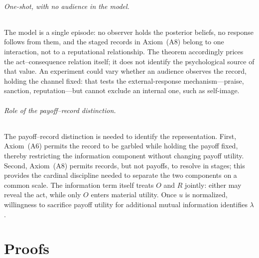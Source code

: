 \documentclass[11pt,a4paper]{article}
\theoremstyle{definition}
\newcommand{\1}{\mathbf 1}
\begin{document}
\paragraph{One-shot, with no audience in the model.}
The model is a single episode: no observer holds the posterior beliefs, no response follows from them, and the
staged records in Axiom~\textup{(A8)} belong to one interaction, not to a reputational relationship.  The theorem
accordingly prices the act--consequence relation itself; it does not identify the psychological source of that
value.  An experiment could vary whether an audience observes the record, holding the channel fixed: that tests
the external-response mechanism---praise, sanction, reputation---but cannot exclude an internal one, such as
self-image.


\paragraph{Role of the payoff--record distinction.}The payoff--record distinction is needed to identify the representation. First, Axiom~\textup{(A6)} permits the record to be garbled while holding the payoff fixed, thereby restricting the information component without changing payoff utility. Second, Axiom~\textup{(A8)} permits records, but not payoffs, to resolve in stages; this provides the cardinal discipline needed to separate the two components on a common scale. The information term itself treats $O$ and $R$ jointly: either may reveal the act, while only $O$ enters material utility. Once $u$ is normalized, willingness to sacrifice payoff utility for additional mutual information identifies $\lambda$.

\clearpage
\appendix

\part*{Proofs}


\clearpage

\clearpage

\end{document}
